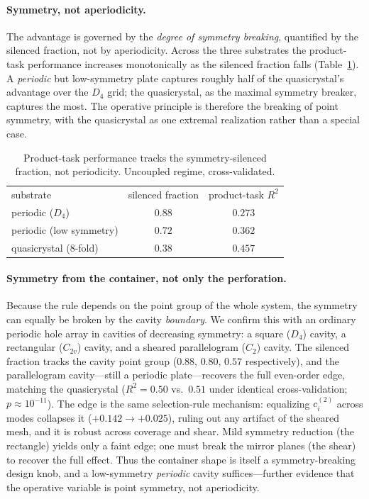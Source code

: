 \documentclass[aps,prapplied,reprint,amsmath,amssymb,floatfix]{revtex4-2}
\begin{document}
\paragraph{Symmetry, not aperiodicity.}
The advantage is governed by the \emph{degree of symmetry breaking}, quantified
by the silenced fraction, not by aperiodicity. Across the three substrates the
product-task performance increases monotonically as the silenced fraction
falls (Table~\ref{tab:three}). A \emph{periodic} but low-symmetry plate
captures roughly half of the quasicrystal's advantage over the $D_4$ grid; the
quasicrystal, as the maximal symmetry breaker, captures the most. The operative
principle is therefore the breaking of point symmetry, with the quasicrystal as
one extremal realization rather than a special case.

\begin{table}[t]
\caption{Product-task performance tracks the symmetry-silenced fraction, not
periodicity. Uncoupled regime, cross-validated.}
\label{tab:three}
\begin{ruledtabular}
\begin{tabular}{lcc}
substrate & silenced fraction & product-task $R^2$ \\
\colrule
periodic ($D_4$)        & $0.88$ & $0.273$ \\
periodic (low symmetry) & $0.72$ & $0.362$ \\
quasicrystal (8-fold)   & $0.38$ & $0.457$ \\
\end{tabular}
\end{ruledtabular}
\end{table}

\paragraph{Symmetry from the container, not only the perforation.}
Because the rule depends on the point group of the whole system, the symmetry
can equally be broken by the cavity \emph{boundary}. We confirm this with an
ordinary periodic hole array in cavities of decreasing symmetry: a square
($D_4$) cavity, a rectangular ($C_{2v}$) cavity, and a sheared parallelogram
($C_2$) cavity. The silenced fraction tracks the cavity point group
($0.88,\,0.80,\,0.57$ respectively), and the parallelogram cavity---still a
periodic plate---recovers the full even-order edge, matching the quasicrystal
($R^2=0.50$ vs.\ $0.51$ under identical cross-validation; $p\approx10^{-11}$).
The edge is the same selection-rule mechanism: equalizing $c^{(2)}_i$ across
modes collapses it ($+0.142\to+0.025$), ruling out any artifact of the sheared
mesh, and it is robust across coverage and shear. Mild symmetry reduction (the
rectangle) yields only a faint edge; one must break the mirror planes (the
shear) to recover the full effect. Thus the container shape is itself a
symmetry-breaking design knob, and a low-symmetry \emph{periodic} cavity
suffices---further evidence that the operative variable is point symmetry, not
aperiodicity.
\end{document}
